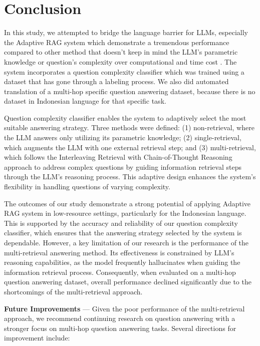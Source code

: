\documentclass[times]{iapress}
\begin{document}
\section{Conclusion}
\label{sec:conclusion}
In this study, we attempted to bridge the language barrier for LLMs, especially the Adaptive RAG system which demonstrate a tremendous performance compared to other method that doesn't keep in mind the LLM's parametric knowledge or question's complexity over computational and time cost \cite{adaptive_rag}. The system incorporates a question complexity classifier which was trained using a dataset that has gone through a labeling process. We also did automated translation of a multi-hop specific question answering dataset, because there is no dataset in Indonesian language for that specific task. 

Question complexity classifier enables the system to adaptively select the most suitable answering strategy. Three methods were defined: (1) non-retrieval, where the LLM answers only utilizing its parametric knowledge; (2) single-retrieval, which augments the LLM with one external retrieval step; and (3) multi-retrieval, which follows the Interleaving Retrieval with Chain-of-Thought Reasoning approach to address complex questions by guiding information retrieval steps through the LLM’s reasoning process. This adaptive design enhances the system’s flexibility in handling questions of varying complexity.

The outcomes of our study demonstrate a strong potential of applying Adaptive RAG system in low-resource settings, particularly for the Indonesian language. This is supported by the accuracy and reliability of our question complexity classifier, which ensures that the answering strategy selected by the system is dependable. However, a key limitation of our research is the performance of the multi-retrieval answering method. Its effectiveness is constrained by LLM's reasoning capabilities, as the model frequently hallucinates when guiding the information retrieval process. Consequently, when evaluated on a multi-hop question answering dataset, overall performance declined significantly due to the shortcomings of the multi-retrieval approach.

\textbf{Future Improvements} — Given the poor performance of the multi-retrieval approach, we recommend continuing research on question answering with a stronger focus on multi-hop question answering tasks. Several directions for improvement include:
\end{document}
